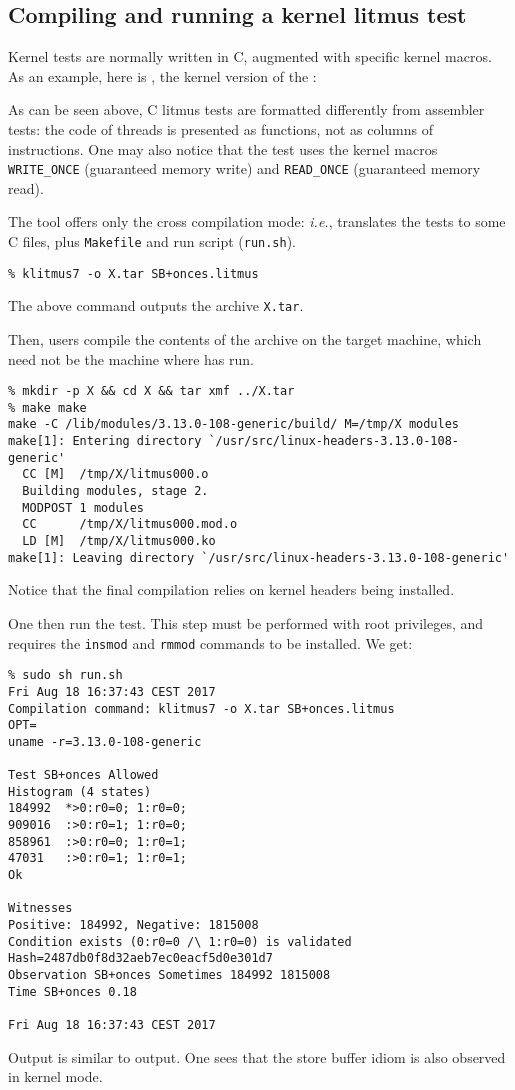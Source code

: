 \subsection{Compiling and running a kernel litmus test}
Kernel tests are normally written in C, augmented with specific kernel macros.
As an example, here is ,
the kernel version of the :


As can be seen above, C litmus tests are formatted differently from assembler
tests: the code of threads is presented as functions, not as columns of
instructions. One may also notice that the test uses the kernel macros
\verb+WRITE_ONCE+ (guaranteed memory write) and \verb+READ_ONCE+
(guaranteed memory read).

The tool \klitmus{} offers only the cross compilation mode:
\emph{i.e.}, \klitmus{} translates the tests to some C files, plus
\texttt{Makefile} and run script (\texttt{run.sh}).
\begin{verbatim}
% klitmus7 -o X.tar SB+onces.litmus
\end{verbatim}
The above command outputs the archive \verb+X.tar+.

Then, users compile the contents of the archive on the target machine, which
need not be the machine where \klitmus{} has run.
\begin{verbatim}
% mkdir -p X && cd X && tar xmf ../X.tar
% make make
make -C /lib/modules/3.13.0-108-generic/build/ M=/tmp/X modules
make[1]: Entering directory `/usr/src/linux-headers-3.13.0-108-generic'
  CC [M]  /tmp/X/litmus000.o
  Building modules, stage 2.
  MODPOST 1 modules
  CC      /tmp/X/litmus000.mod.o
  LD [M]  /tmp/X/litmus000.ko
make[1]: Leaving directory `/usr/src/linux-headers-3.13.0-108-generic'
\end{verbatim}
Notice that the final compilation relies on kernel headers being installed.

One then run the test. This step must be performed with root
privileges, and requires the \texttt{insmod} and \texttt{rmmod}
commands to be installed. We get:
\begin{verbatim}
% sudo sh run.sh 
Fri Aug 18 16:37:43 CEST 2017
Compilation command: klitmus7 -o X.tar SB+onces.litmus
OPT=
uname -r=3.13.0-108-generic

Test SB+onces Allowed
Histogram (4 states)
184992  *>0:r0=0; 1:r0=0;
909016  :>0:r0=1; 1:r0=0;
858961  :>0:r0=0; 1:r0=1;
47031   :>0:r0=1; 1:r0=1;
Ok

Witnesses
Positive: 184992, Negative: 1815008
Condition exists (0:r0=0 /\ 1:r0=0) is validated
Hash=2487db0f8d32aeb7ec0eacf5d0e301d7
Observation SB+onces Sometimes 184992 1815008
Time SB+onces 0.18

Fri Aug 18 16:37:43 CEST 2017
\end{verbatim}
Output is similar to \litmus{} output. One sees that the store buffer idiom
is also observed in kernel mode.

